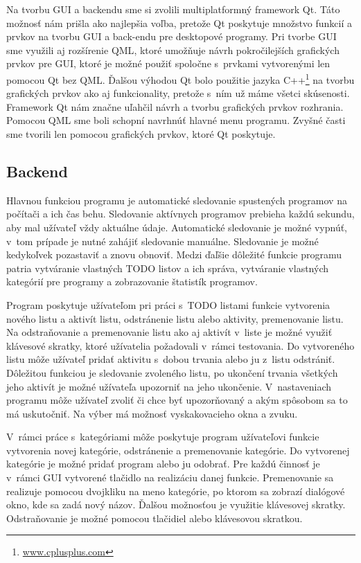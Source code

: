 \documentclass[]{article}
\begin{document}
Na tvorbu GUI a backendu sme si zvolili multiplatformný framework Qt\cite{doc_qt}. Táto možnosť nám prišla ako najlepšia voľba, pretože Qt poskytuje množstvo funkcií a prvkov na tvorbu GUI a back-endu pre desktopové programy. Pri tvorbe GUI sme využili aj rozšírenie QML\cite{qml}, ktoré umožňuje návrh pokročilejších grafických prvkov pre GUI, ktoré je možné použiť spoločne s~prvkami vytvorenými len pomocou Qt bez QML. Ďalšou výhodou Qt bolo použitie jazyka C++\footnote{\url{www.cplusplus.com}} na tvorbu grafických prvkov ako aj funkcionality, pretože s~ním už máme všetci skúsenosti.
Framework Qt nám značne uľahčil návrh a tvorbu grafických prvkov rozhrania. Pomocou QML sme boli schopní navrhnúť hlavné menu programu. Zvyšné časti sme tvorili len pomocou grafických prvkov, ktoré Qt poskytuje.

\subsection{Backend}
Hlavnou funkciou programu je automatické sledovanie spustených programov na počítači a ich čas behu. Sledovanie aktívnych programov prebieha každú sekundu, aby mal užívateľ vždy aktuálne údaje. Automatické sledovanie je možné vypnúť, v~tom prípade je nutné zahájiť sledovanie manuálne. Sledovanie je možné kedykoľvek pozastaviť a znovu obnoviť.
Medzi ďaľšie dôležité funkcie programu patria vytváranie vlastných TODO listov a ich správa, vytváranie vlastných kategórií pre programy a zobrazovanie štatistík programov.

Program poskytuje užívateľom pri práci s~TODO listami funkcie vytvorenia nového listu a aktivít listu, odstránenie listu alebo aktivity, premenovanie listu. Na odstraňovanie a premenovanie listu ako aj aktivít v~liste je možné využiť klávesové skratky, ktoré užívatelia požadovali v~rámci testovania. Do vytvoreného listu môže užívateľ pridať aktivitu s~dobou trvania alebo ju z~listu odstrániť. Dôležitou funkciou je sledovanie zvoleného listu, po ukončení trvania všetkých jeho aktivít je možné užívateľa upozorniť na jeho ukončenie. V~nastaveniach programu môže užívateľ zvoliť či chce byť upozorňovaný a akým spôsobom sa to má uskutočniť. Na výber má možnosť vyskakovacieho okna a zvuku.

V~rámci práce s~kategóriami môže poskytuje program užívateľovi funkcie vytvorenia novej kategórie, odstránenie a premenovanie kategórie. Do vytvorenej kategórie je možné pridať program alebo ju odobrať. Pre každú činnosť je v~rámci GUI vytvorené tlačidlo na realizáciu danej funkcie. Premenovanie sa realizuje pomocou dvojkliku na meno kategórie, po ktorom sa zobrazí dialógové okno, kde sa zadá nový názov. Ďalšou možnosťou je využitie klávesovej skratky. Odstraňovanie je možné pomocou tlačidiel alebo klávesovou skratkou.
\end{document}
